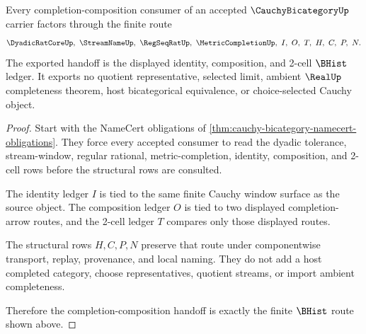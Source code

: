 \begin{theorem}
\label{thm:cauchy-bicategory-completion-composition-handoff}
Every completion-composition consumer of an accepted $\CauchyBicategoryUp$ carrier factors through the finite route
$$
\DyadicRatCoreUp,\ \StreamNameUp,\ \RegSeqRatUp,\ \MetricCompletionUp,\ I,\ O,\ T,\ H,\ C,\ P,\ N .
$$
The exported handoff is the displayed identity, composition, and 2-cell $\BHist$ ledger. It exports no quotient representative, selected limit, ambient $\RealUp$ completeness theorem, host bicategorical equivalence, or choice-selected Cauchy object.
\end{theorem}
\begin{proof}
Start with the NameCert obligations of \autoref{thm:cauchy-bicategory-namecert-obligations}. They force every accepted consumer to read the dyadic tolerance, stream-window, regular rational, metric-completion, identity, composition, and 2-cell rows before the structural rows are consulted.

The identity ledger $I$ is tied to the same finite Cauchy window surface as the source object. The composition ledger $O$ is tied to two displayed completion-arrow routes, and the 2-cell ledger $T$ compares only those displayed routes.

The structural rows $H,C,P,N$ preserve that route under componentwise transport, replay, provenance, and local naming. They do not add a host completed category, choose representatives, quotient streams, or import ambient completeness.

Therefore the completion-composition handoff is exactly the finite $\BHist$ route shown above.
\end{proof}




